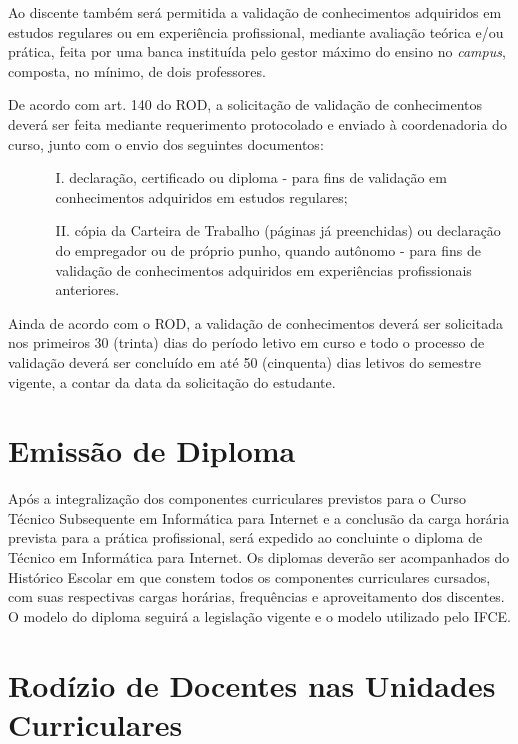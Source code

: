 \documentclass[
	12pt,				%
	openright,			%
	twoside,			%
	a4paper,			%
	chapter=TITLE,		%
	english,			%
	french,				%
	spanish,			%
	brazil,				%
	]{abntex2}
\begin{document}
Ao discente também será permitida a validação de conhecimentos adquiridos em estudos regulares ou em experiência profissional, mediante avaliação teórica e/ou prática, feita por uma banca instituída pelo gestor máximo do ensino no \textit{campus}, composta, no mínimo, de dois professores. 

De acordo com art. 140 do ROD, a solicitação de validação de conhecimentos deverá ser feita mediante requerimento protocolado e enviado à coordenadoria do curso, junto com o envio dos seguintes documentos: 
\begin{itemize}
\item[]
\begin{itemize}
	\item [I.] declaração, certificado ou diploma - para fins de validação em conhecimentos adquiridos em estudos regulares; 
	\item [II.] cópia da Carteira de Trabalho (páginas já preenchidas) ou declaração do empregador ou de próprio punho, quando autônomo - para fins de validação de conhecimentos adquiridos em experiências profissionais anteriores. 
\end{itemize}
\end{itemize}

Ainda de acordo com o ROD, a validação de conhecimentos deverá ser solicitada nos primeiros 30 (trinta) dias do período letivo em curso e todo o processo de validação deverá ser concluído em até 50 (cinquenta) dias letivos do semestre vigente, a contar da data da solicitação do estudante. 


\section{Emissão de Diploma}

Após a integralização dos componentes curriculares previstos para o Curso Técnico Subsequente em Informática para Internet e a conclusão da carga horária prevista para a prática profissional, será expedido ao concluinte o diploma de Técnico em Informática para Internet. Os diplomas deverão ser acompanhados do Histórico Escolar em que constem todos os componentes curriculares cursados, com suas respectivas cargas horárias, frequências e aproveitamento dos discentes. O modelo do diploma seguirá a legislação vigente e o modelo utilizado pelo IFCE.




\section{Rodízio de Docentes nas Unidades Curriculares}
\end{document}
